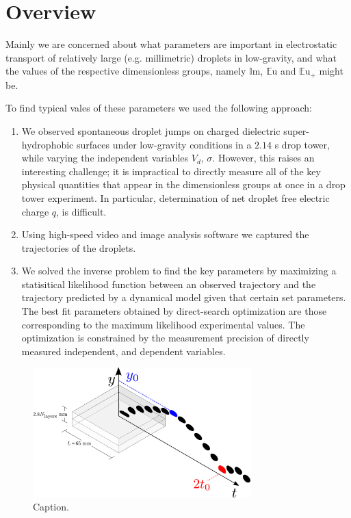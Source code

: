 \documentclass[10pt,a4paper]{article}
\author{Erin Schmidt}
\begin{document}
\doublespacing
\section{Overview}
Mainly we are concerned about what parameters are important in electrostatic transport of relatively large (e.g. millimetric) droplets in low-gravity, and what the values of the respective dimensionless groups, namely $\mathbb{I}\mbox{m}$, $\mathbb{E}\mbox{u}$ and ${\mathbb{E}\mbox{u}}_+$ might be.

To find typical vales of these parameters we used the following approach:
\begin{enumerate}
\item We observed spontaneous droplet jumps on charged dielectric super-hydrophobic surfaces under low-gravity conditions in a $2.14$ s drop tower, while varying the independent variables $V_d$, $\sigma$. However, this raises an interesting challenge; it is impractical to directly measure all of the key physical quantities that appear in the dimensionless groups at once in a drop tower experiment. In particular, determination of net droplet free electric charge $q$, is difficult. 
\item Using high-speed video and image analysis software we captured the trajectories of the droplets. 
\item We solved the inverse problem to find the key parameters by maximizing a statisitical likelihood function between an observed trajectory and the trajectory predicted by a dynamical model given that certain set parameters. The best fit parameters obtained by direct-search optimization are those corresponding to the maximum likelihood experimental values. The optimization is constrained by the measurement precision of directly measured independent, and dependent variables.
\end{enumerate}

\begin{figure}[ht]
 \centering
 \includegraphics[width=0.75\textwidth]{../figures/apparatus0.pdf}
 \caption{Caption.\label{fig:apparatus0}}
\end{figure}
\end{document}
